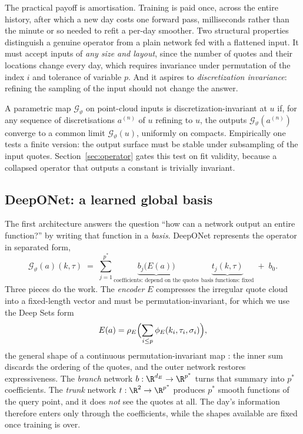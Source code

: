 The practical payoff is amortisation. Training is paid once, across the entire history, after
which a new day costs one forward pass, milliseconds rather than the minute or so needed to
refit a per-day smoother. Two structural properties distinguish a genuine operator from a plain
network fed with a flattened input. It must accept inputs of \emph{any size and layout}, since
the number of quotes and their locations change every day, which requires invariance under
permutation of the index $i$ and tolerance of variable $p$. And it aspires to
\emph{discretization invariance}: refining the sampling of the input should not change the
answer.

\begin{definition}\label{def:discinv}
A parametric map $\mathcal G_\vartheta$ on point-cloud inputs is discretization-invariant at $u$
if, for any sequence of discretisations $a^{(n)}$ of $u$ refining to $u$, the outputs
$\mathcal G_\vartheta(a^{(n)})$ converge to a common limit $\mathcal G_\vartheta(u)$, uniformly
on compacts. Empirically one tests a finite version: the output surface must be stable under
subsampling of the input quotes. Section~\ref{sec:operator} gates this test on fit validity,
because a collapsed operator that outputs a constant is trivially invariant.
\end{definition}

\subsection{DeepONet: a learned global basis}

The first architecture answers the question ``how can a network output an entire function?'' by
writing that function in a \emph{basis}. DeepONet \cite{lu2021} represents the operator in
separated form,
\begin{equation}\label{eq:deeponet}
\mathcal G_\vartheta(a)(k,\tau)\;=\;\sum_{j=1}^{p^\ast}
\underbrace{b_j\bigl(E(a)\bigr)}_{\text{coefficients: depend on the quotes}}\;
\underbrace{t_j(k,\tau)}_{\text{basis functions: fixed}}\;+\;b_0 .
\end{equation}
Three pieces do the work. The \emph{encoder} $E$ compresses the irregular quote cloud into a
fixed-length vector and must be permutation-invariant, for which we use the Deep Sets form
\begin{equation}\label{eq:deepsets}
E(a)=\rho_E\Bigl(\sum_{i\le p}\phi_E(k_i,\tau_i,\sigma_i)\Bigr),
\end{equation}
the general shape of a continuous permutation-invariant map \cite{zaheer2017}: the inner sum
discards the ordering of the quotes, and the outer network restores expressiveness. The
\emph{branch} network $b:\R^{d_E}\to\R^{p^\ast}$ turns that summary into $p^\ast$ coefficients.
The \emph{trunk} network $t:\R^2\to\R^{p^\ast}$ produces $p^\ast$ smooth functions of the query
point, and it does \emph{not} see the quotes at all. The day's information therefore enters only
through the coefficients, while the shapes available are fixed once training is over.

